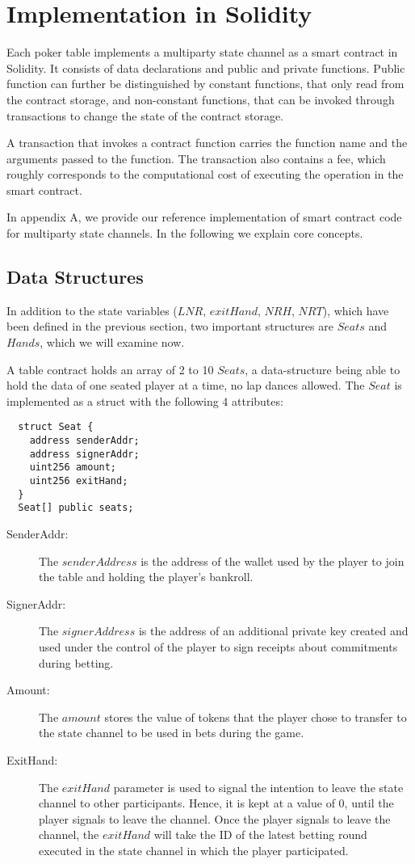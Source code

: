 \section{Implementation in Solidity}

Each poker table implements a multiparty state channel as a smart contract in Solidity. It consists of data declarations and public and private functions. Public function can further be distinguished by constant functions, that only read from the contract storage, and non-constant functions, that can be invoked through transactions to change the state of the contract storage.

A transaction that invokes a contract function carries the function name and the arguments passed to the function. The transaction also contains a fee, which roughly corresponds to the computational cost of executing the operation in the smart contract.

In appendix A, we provide our reference implementation of smart contract code for multiparty state channels. In the following we explain core concepts.

\subsection{Data Structures}

In addition to the state variables (\(LNR\), \(exitHand\), \(NRH\), \(NRT\)), which have been defined in the previous section, two important structures are \(Seats\) and \(Hands\), which we will examine now.

A table contract holds an array of 2 to 10 \(Seats\), a data-structure being able to hold the data of one seated player at a time, no lap dances allowed. The \(Seat\) is implemented as a struct with the following 4 attributes:

\begin{verbatim}
  struct Seat {
    address senderAddr;
    address signerAddr;
    uint256 amount;
    uint256 exitHand;
  }
  Seat[] public seats;
\end{verbatim}

\begin{description}
\item[SenderAddr:] The \(senderAddress\) is the address of the wallet used by the player to join the table and holding the player's bankroll.
\item[SignerAddr:] The \(signerAddress\) is the address of an additional private key created and used under the control of the player to sign receipts about commitments during betting.
\item[Amount:] The \(amount\) stores the value of tokens that the player chose to transfer to the state channel to be used in bets during the game.
\item[ExitHand:] The \(exitHand\) parameter is used to signal the intention to leave the state channel to other participants. Hence, it is kept at a value of 0, until the player signals to leave the channel. Once the player signals to leave the channel, the \(exitHand\) will take the ID of the latest betting round executed in the state channel in which the player participated.
\end{description}

